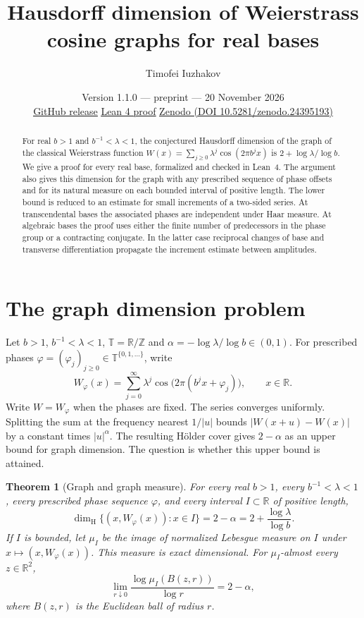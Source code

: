 \documentclass[11pt,a4paper]{article}
\title{Hausdorff dimension of Weierstrass cosine graphs for real bases}
\author{Timofei Iuzhakov}
\date{\normalsize Version 1.1.0 --- preprint --- 20 November 2026\\[2pt]
  {\small \href{https://github.com/ppadfoot/weierstrass-real-bases/releases/tag/v1.1.0}{\underline{GitHub release}}
  \quad\href{https://github.com/ppadfoot/weierstrass-real-bases/tree/v1.1.0/formalization}{\underline{Lean 4 proof}}
  \quad\href{https://doi.org/10.5281/zenodo.24395193}{\underline{Zenodo (DOI 10.5281/zenodo.24395193)}}}}
\newtheorem{theorem}{Theorem}[section]
\newcommand{\T}{\mathbb T}
\begin{document}
\maketitle
\begin{abstract}
For real $b>1$ and $b^{-1}<\lambda<1$, the conjectured Hausdorff dimension
of the graph of the classical Weierstrass function
$W(x)=\sum_{j\ge0}\lambda^j\cos(2\pi b^j x)$ is
$2+\log\lambda/\log b$. We give a proof for every real base, formalized and checked in Lean~4. The argument also gives this dimension for the graph with any
prescribed sequence of phase offsets and for its natural measure on
each bounded interval of positive length. The lower bound is reduced
to an estimate for small increments of a two-sided series. At
transcendental bases the associated phases are independent under Haar
measure. At algebraic bases the proof uses either the finite number of
predecessors in the phase group or a contracting conjugate. In the
latter case reciprocal changes of base and transverse differentiation
propagate the increment estimate between amplitudes.
\end{abstract}

\section{The graph dimension problem}\label{sec:intro}
Let $b>1$, $b^{-1}<\lambda<1$, $\T=\mathbb R/\mathbb Z$ and
$\alpha=-\log\lambda/\log b\in(0,1)$. For prescribed phases
$\varphi=(\varphi_j)_{j\ge0}\in\T^{\{0,1,\ldots\}}$, write
\[
 W_\varphi(x)=\sum_{j=0}^{\infty}\lambda^j
              \cos\bigl(2\pi(b^jx+\varphi_j)\bigr),\qquad x\in\mathbb R.
\]
Write $W=W_\varphi$ when the phases are fixed. The series converges
uniformly. Splitting the sum at the frequency nearest $1/|u|$ bounds
$|W(x+u)-W(x)|$ by a constant times $|u|^\alpha$. The resulting
H\"older cover gives $2-\alpha$ as an upper bound for graph dimension.
The question is whether this upper bound is attained.

\begin{theorem}[Graph and graph measure]\label{thm:main}
For every real $b>1$, every $b^{-1}<\lambda<1$, every prescribed
phase sequence $\varphi$, and every interval $I\subset\mathbb R$ of
positive length,
\[
 \dim_{\mathrm H}\{(x,W_\varphi(x)):x\in I\}=2-\alpha
                    =2+\frac{\log\lambda}{\log b}.
\]
If $I$ is bounded, let $\mu_I$ be the image of normalized Lebesgue
measure on $I$ under $x\mapsto(x,W_\varphi(x))$. This measure is
exact dimensional. For $\mu_I$-almost every $z\in\mathbb R^2$,
\[
 \lim_{r\downarrow0}\frac{\log\mu_I(B(z,r))}{\log r}=2-\alpha,
\]
where $B(z,r)$ is the Euclidean ball of radius $r$.
\end{theorem}
\end{document}
